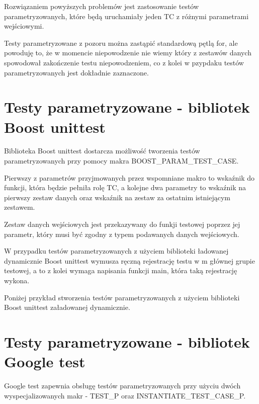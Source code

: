 \documentclass[12pt,a4paper,notitlepage]{report}
\begin{document}
Rozwiązaniem powyższych problemów jest zastosowanie testów parametryzowanych, które będą uruchamiały jeden TC z różnymi parametrami wejściowymi. 

Testy parametryzowane z pozoru można zastąpić standardową pętlą for, ale powoduję to, że w momencie niepowodzenie nie wiemy który z zestawów danych spowodował zakończenie testu niepowodzeniem, co z kolei w pzypdaku testów parametryzowanych jest dokładnie zaznaczone.

\section{Testy parametryzowane - bibliotek Boost unittest}

Biblioteka Boost unittest dostarcza możliwość tworzenia testów parametryzowanych przy pomocy makra BOOST{\_}PARAM{\_}TEST{\_}CASE.

Pierwszy z parametrów przyjmowanych przez wspomniane makro to wskaźnik do funkcji, która będzie pełniła rolę TC, a kolejne dwa parametry to wskaźnik na pierwszy zestaw danych oraz wskaźnik na zestaw za ostatnim istniejącym zestawem.

Zestaw danych wejściowych jest przekazywany do funkji testowej poprzez jej parametr, który musi być zgodny z typem podawanych danych wejściowych.

W przypadku testów parametryzowanych z użyciem biblioteki ładowanej dynamicznie Boost unittest wymusza ręczną rejestrację testu w m głównej grupie testowej, a to z kolei wymaga napisania funkcji main, która taką rejestrację wykona.

Poniżej przykład stworzenia testów parametryzowanych z użyciem biblioteki Boost unittest załadowanej dynamicznie.

			

\section{Testy parametryzowane - bibliotek Google test}

Google test zapewnia obsługę testów parametryzowanych przy użyciu dwóch wyspecjalizowanych makr - TEST{\_}P oraz INSTANTIATE{\_}TEST{\_}CASE{\_}P.
\end{document}
